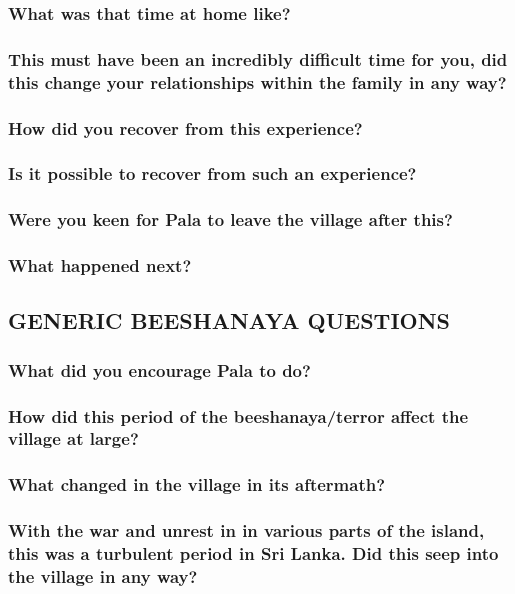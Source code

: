 \documentclass[11pt]{article}
\begin{document}
\subsubsection{What was that time at home like?}
\label{sec:orgd99a849}
\subsubsection{This must have been an incredibly difficult time for you, did this change your relationships within the family in any way?}
\label{sec:orgf080afe}
\subsubsection{How did you recover from this experience?}
\label{sec:org7180d40}
\subsubsection{Is it possible to recover from such an experience?}
\label{sec:orgcb79911}
\subsubsection{Were you keen for Pala to leave the village after this?}
\label{sec:orgc7aa038}
\subsubsection{What happened next?}
\label{sec:org2a462a7}

\subsection{GENERIC BEESHANAYA QUESTIONS}
\label{sec:org0956372}

\subsubsection{What did you encourage Pala to do?}
\label{sec:orgdd10d86}
\subsubsection{How did this period of the beeshanaya/terror affect the village at large?}
\label{sec:org245b238}
\subsubsection{What changed in the village in its aftermath?}
\label{sec:org26f2a38}
\subsubsection{With the war and unrest in in various parts of the island, this was a turbulent period in Sri Lanka. Did this seep into the village in any way?}
\label{sec:org93ebd14}
\end{document}
